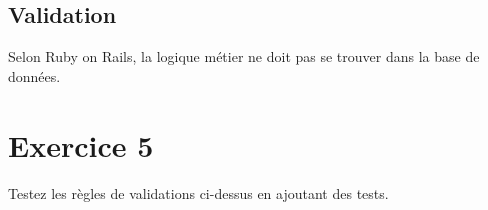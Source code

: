 \begin{otherlanguage}{english}

\begin{Shaded}
\begin{Highlighting}[]

\end{Highlighting}
\end{Shaded}

\end{otherlanguage}

\hypertarget{validation}{%
\subsection{Validation}\label{validation}}

Selon Ruby on Rails, la logique métier ne doit pas se trouver dans la
base de données.

\begin{otherlanguage}{english}

\begin{Shaded}
\begin{Highlighting}[]

 \NormalTok{ < }\NormalTok{::}
\NormalTok{, }
\NormalTok{, }\NormalTok{\{ }\NormalTok{ \}}
\end{Highlighting}
\end{Shaded}

\end{otherlanguage}

\hypertarget{exercice-5}{%
\section{Exercice 5}\label{exercice-5}}

Testez les règles de validations ci-dessus en ajoutant des tests.

\begin{otherlanguage}{english}

\begin{Shaded}
\begin{Highlighting}[]
\NormalTok{$ }
\NormalTok{$ }
\NormalTok{$ }
\end{Highlighting}
\end{Shaded}

\end{otherlanguage}

